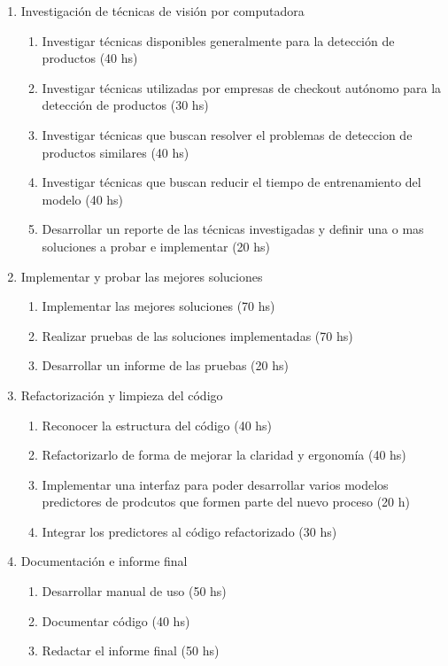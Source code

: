 \documentclass[
11pt, %
codirector, %
]{charter}
\begin{document}
\begin{enumerate}
\item Investigación de técnicas de visión por computadora
	\begin{enumerate}
	\item Investigar técnicas disponibles generalmente para la detección de productos (40 hs)
	\item Investigar técnicas utilizadas por empresas de checkout autónomo para la detección de productos (30 hs)
	\item Investigar técnicas que buscan resolver el problemas de deteccion de productos similares (40 hs)
	\item Investigar técnicas que buscan reducir el tiempo de entrenamiento del modelo (40 hs)
	\item Desarrollar un reporte de las técnicas investigadas y definir una o mas soluciones a probar e implementar (20 hs)
	\end{enumerate}
\item Implementar y probar las mejores soluciones 
	\begin{enumerate}
	\item Implementar las mejores soluciones (70 hs)
	\item Realizar pruebas de las soluciones implementadas (70 hs)
	\item Desarrollar un informe de las pruebas (20 hs)
	\end{enumerate}
\item Refactorización y limpieza del código 
	\begin{enumerate}
	\item Reconocer la estructura del código (40 hs)
	\item Refactorizarlo de forma de mejorar la claridad y ergonomía (40 hs)
	\item Implementar una interfaz para poder desarrollar varios modelos predictores de prodcutos que formen parte del nuevo proceso (20 h)
	\item Integrar los predictores al código refactorizado (30 hs)
	\end{enumerate}
\item Documentación e informe final
	\begin{enumerate}
	\item Desarrollar manual de uso (50 hs)
	\item Documentar código (40 hs)
	\item Redactar el informe final (50 hs)
	\end{enumerate}
\end{enumerate}
\end{document}

